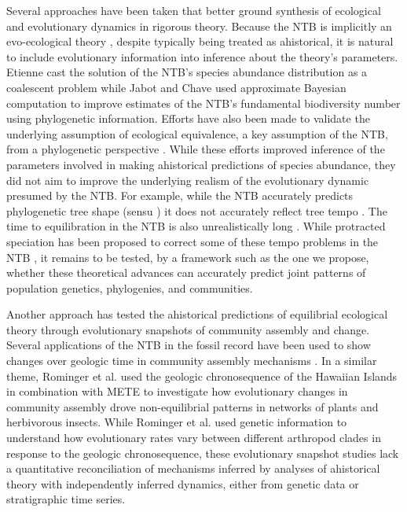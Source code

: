 \documentclass[12pt]{article}
\begin{document}
Several approaches have been taken that better ground synthesis of
ecological and evolutionary dynamics in rigorous theory. Because the
NTB is implicitly an evo-ecological theory \citep{Hubbell2001-dx,
  Hubbell2005-ng}, despite typically being treated as ahistorical, it
is natural to include evolutionary information into inference about
the theory's parameters. Etienne cast the solution of the NTB's
species abundance distribution as a coalescent problem
\citep{Etienne2004-fm} while Jabot and Chave \citep{Jabot2009-xr} used
approximate Bayesian computation to improve estimates of the NTB's
fundamental biodiversity number using phylogenetic
information. Efforts have also been made to validate the underlying
assumption of ecological equivalence, a key assumption of the NTB,
from a phylogenetic perspective \citep{Burbrink2015-vx}. While these
efforts improved inference of the parameters involved in making
ahistorical predictions of species abundance, they did not aim to
improve the underlying realism of the evolutionary dynamic presumed by
the NTB. For example, while the NTB accurately predicts phylogenetic
tree shape (sensu \citep{Jabot2009-xr}) it does not accurately reflect
tree tempo \citep{Davies2011-mz}. The time to equilibration in the NTB
is also unrealistically long \citep{Ricklefs2006-tn}. While protracted
speciation has been proposed to correct some of these tempo problems
in the NTB \citep{Rosindell2010-gq}, it remains to be tested, by a
framework such as the one we propose, whether these theoretical
advances can accurately predict joint patterns of population genetics,
phylogenies, and communities.

Another approach has tested the ahistorical predictions of equilibrial
ecological theory through evolutionary snapshots of community assembly
and change. Several applications of the NTB in the fossil record have
been used to show changes over geologic time in community assembly
mechanisms \citep{Olszewski2004-ud, Wagner2006-te}. In a similar theme,
Rominger et al. \citep{Rominger2015-kb} used the geologic
chronosequence of the Hawaiian Islands in combination with METE to
investigate how evolutionary changes in community assembly drove
non-equilibrial patterns in networks of plants and herbivorous
insects. While Rominger et al. used genetic information to understand
how evolutionary rates vary between different arthropod clades in
response to the geologic chronosequence, these evolutionary snapshot
studies lack a quantitative reconciliation of mechanisms inferred by
analyses of ahistorical theory with independently inferred dynamics,
either from genetic data or stratigraphic time series.
\end{document}
